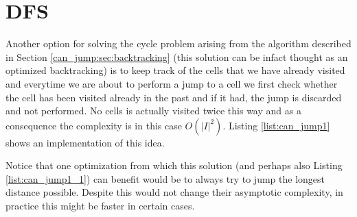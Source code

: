	
 
\section{DFS}
\label{can_jump:sec:DP1}
Another option for solving the cycle problem arising from the algorithm described in Section
\ref{can_jump:sec:backtracking} (this solution can be infact thought as an optimized backtracking)
is to keep track of the cells that we have already visited and everytime we are about to perform a
jump to a cell we first check whether the cell has been visited already in the past and if it had,
the jump is discarded and not performed. No cells is actually visited twice this way and as a
consequence the complexity is in this case $O(|I|^2)$. Listing \ref{list:can_jump1} shows an
implementation of this idea. 




Notice that one optimization from which this solution (and perhaps also Listing
\ref{list:can_jump1_1}) can benefit would be to always try to jump the longest distance possible.
Despite this would not change their asymptotic complexity, in practice this might be faster in
certain cases.



